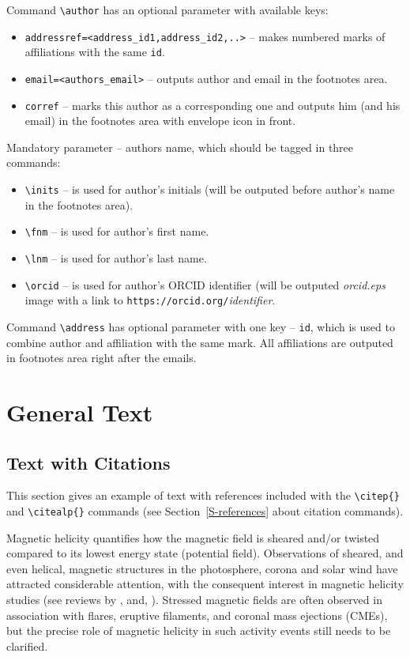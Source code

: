 \documentclass[namedreferences]{solarphysics}
\begin{document}
\begin{article}
Command \verb+\author+  has an optional parameter with available keys: 
\begin{itemize}
\item \verb+addressref=<address_id1,address_id2,..>+ -- makes numbered marks of affiliations with the same \texttt{id}.
\item \verb+email=<authors_email>+ -- outputs author and email in the footnotes area.
\item \verb+corref+ -- marks this author as a corresponding one and outputs him (and his email) in the footnotes area with envelope icon in front. 
\end{itemize}
Mandatory parameter -- authors name, which should be tagged in three commands:
\begin{itemize}
\item \verb+\inits+ -- is used for author's initials (will be outputed before author's name in the footnotes area).
\item \verb+\fnm+ -- is used for author's first name.
\item \verb+\lnm+ -- is used for author's last name.
\item \verb+\orcid+ -- is used for author's ORCID identifier (will be outputed \textit{orcid.eps} image with a link to \verb+https://orcid.org/+\textit{identifier}.
\end{itemize}

Command \verb+\address+ has optional parameter  with one key -- \texttt{id}, which is used to combine author and affiliation with the same mark.
All affiliations are outputed in footnotes area right after the emails.
 
\section{General Text} %
      \label{S-general}      

\subsection{Text with Citations} %
  \label{S-text}
This section gives an example of text with references 
included with the \verb+\citep{}+ and \verb+\citealp{}+ commands
(see Section~\ref{S-references} about citation commands).

Magnetic helicity quantifies how the magnetic field is sheared
and/or twisted compared to its lowest energy state (potential
field). Observations of sheared, and even helical, magnetic
structures in the photosphere, corona and solar wind have
attracted considerable attention, with the consequent interest in
magnetic helicity studies (see reviews by \citealp{Brown99}, and,
\citealp{Berger03}). Stressed magnetic fields are often observed
in association with flares, eruptive filaments, and coronal mass
ejections (CMEs), but the precise role of magnetic helicity in
such activity events still needs to be clarified.


\end{article}
\end{document}
